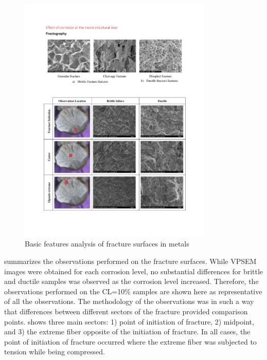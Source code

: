 \begin{figure}[htbp]
	\centering
	\includegraphics[width=0.825\textwidth]{VAC Thesis 2.0/Chapter-4/figs/FractographyBasics_101.pdf}
	\caption{Basic features analysis of fracture surfaces in metals}
	\label{fig:fractography101}
\end{figure}

 summarizes the observations performed on the fracture surfaces. While VPSEM images were obtained for each corrosion level, no substantial differences for brittle and ductile samples was observed as the corrosion level increased. Therefore, the observations performed on the CL=10\% samples are shown here as representative of all the observations. The methodology of the observations was in such a way that differences between different sectors of the fracture provided comparison points.   shows three main sectors: 1) point of initiation of fracture, 2) midpoint, and 3) the extreme fiber opposite of the initiation of fracture. In all cases, the point of initiation of fracture occurred where the extreme fiber was subjected to tension while being compressed.

